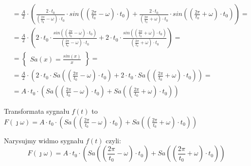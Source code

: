 \begin{task}
\begin{align*}
&=\frac{A}{2} \cdot \left(  \frac{2\cdot t_0}{\left(\frac{2\pi}{t_0} - \omega \right)\cdot t_0} \cdot sin\left(\left(\frac{2\pi}{t_0} - \omega \right) \cdot t_0 \right)  + \frac{2 \cdot t_0}{\left(\frac{2\pi}{t_0} + \omega \right)\cdot t_0} \cdot sin\left(\left(\frac{2\pi}{t_0} + \omega \right) \cdot t_0 \right) \right)=\\
&=\frac{A}{2} \cdot \left(  2\cdot t_0 \cdot \frac{ sin\left(\left(\frac{2\pi}{t_0} - \omega \right) \cdot t_0 \right)}{\left(\frac{2\pi}{t_0} - \omega \right)\cdot t_0}  + 2 \cdot t_0 \cdot \frac{sin\left(\left(\frac{2\pi}{t_0} + \omega \right) \cdot t_0 \right)}{\left(\frac{2\pi}{t_0} + \omega \right)\cdot t_0} \right)=\\
&=\begin{Bmatrix}
Sa(x)=\frac{sin(x)}{x}
\end{Bmatrix}=\\
&=\frac{A}{2} \cdot \left(  2\cdot t_0 \cdot Sa\left(\left(\frac{2\pi}{t_0} - \omega \right) \cdot t_0 \right) + 2 \cdot t_0 \cdot Sa\left(\left(\frac{2\pi}{t_0} + \omega \right) \cdot t_0 \right) \right)=\\
&=A \cdot t_0 \cdot \left( Sa\left(\left(\frac{2\pi}{t_0} - \omega \right) \cdot t_0 \right) + Sa\left(\left(\frac{2\pi}{t_0} + \omega \right) \cdot t_0 \right) \right)
\end{align*}

Transformata sygnału $f(t)$ to $F(\jmath \omega)=A \cdot t_0 \cdot \left( Sa\left(\left(\frac{2\pi}{t_0} - \omega \right) \cdot t_0 \right) + Sa\left(\left(\frac{2\pi}{t_0} + \omega \right) \cdot t_0 \right) \right)$


Narysujmy widmo sygnału $f(t)$ czyli:
\begin{equation}
F(\jmath \omega)=A \cdot t_0 \cdot \left( Sa\left(\left(\frac{2\pi}{t_0} - \omega \right) \cdot t_0 \right) + Sa\left(\left(\frac{2\pi}{t_0} + \omega \right) \cdot t_0 \right) \right)
\end{equation}


\begin{figure}[H]
	\centering
\end{figure}
\end{task}
